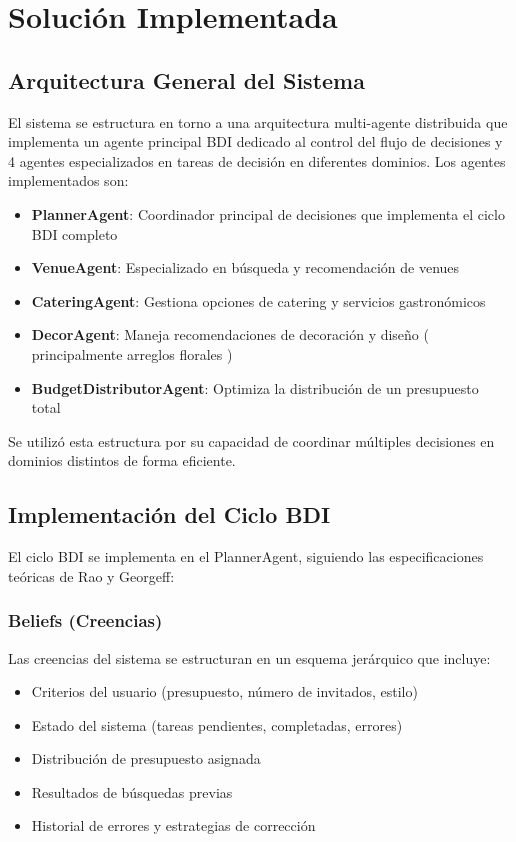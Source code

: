 \documentclass[runningheads,a4paper]{llncs}
\begin{document}
\section{Solución Implementada}

\subsection{Arquitectura General del Sistema}

El sistema se estructura en torno a una arquitectura multi-agente distribuida que implementa un agente principal BDI dedicado al control del flujo de decisiones y 4 agentes especializados en tareas de decisión en diferentes dominios. Los agentes implementados son:

\begin{itemize}
    \item \textbf{PlannerAgent}: Coordinador principal de decisiones que implementa el ciclo BDI completo
    \item \textbf{VenueAgent}: Especializado en búsqueda y recomendación de venues
    \item \textbf{CateringAgent}: Gestiona opciones de catering y servicios gastronómicos
    \item \textbf{DecorAgent}: Maneja recomendaciones de decoración y diseño ( principalmente arreglos florales )
    \item \textbf{BudgetDistributorAgent}: Optimiza la distribución de un presupuesto total
\end{itemize}

Se utilizó esta estructura por su capacidad de coordinar múltiples decisiones en dominios distintos de forma eficiente.

\subsection{Implementación del Ciclo BDI}

El ciclo BDI se implementa en el PlannerAgent, siguiendo las especificaciones teóricas de Rao y Georgeff:

\subsubsection{Beliefs (Creencias)}
Las creencias del sistema se estructuran en un esquema jerárquico que incluye:
\begin{itemize}
    \item Criterios del usuario (presupuesto, número de invitados, estilo)
    \item Estado del sistema (tareas pendientes, completadas, errores)
    \item Distribución de presupuesto asignada
    \item Resultados de búsquedas previas
    \item Historial de errores y estrategias de corrección
\end{itemize}
\end{document}

